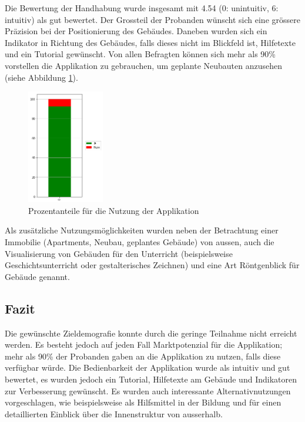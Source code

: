 \documentclass[a4paper]{scrreprt}
\begin{document}
Die Bewertung der Handhabung wurde insgesamt mit 4.54 (0: unintuitiv, 6: intuitiv) als gut bewertet. Der Grossteil der Probanden wünscht sich eine grössere Präzision bei der Positionierung des Gebäudes. Daneben wurden sich ein Indikator in Richtung des Gebäudes, falls dieses nicht im Blickfeld ist, Hilfetexte und ein Tutorial gewünscht. Von allen Befragten können sich mehr als 90\% vorstellen die Applikation zu gebrauchen, um geplante Neubauten anzusehen (siehe Abbildung \ref{fig:Nutzung}).

\begin{figure}[htb]
	\centering
	\includegraphics[keepaspectratio, width=0.3\textwidth]{Nutzung.png}
	\caption{Prozentanteile für die Nutzung der Applikation}
	\label{fig:Nutzung}
\end{figure}

Als zusätzliche Nutzungsmöglichkeiten wurden neben der Betrachtung einer Immobilie (Apartments, Neubau, geplantes Gebäude) von aussen, auch die Visualisierung von Gebäuden für den Unterricht (beispielsweise Geschichtsunterricht oder gestalterisches Zeichnen) und eine Art Röntgenblick für Gebäude genannt.

\subsection{Fazit}
Die gewünschte Zieldemografie konnte durch die geringe Teilnahme nicht erreicht werden. Es besteht jedoch auf jeden Fall Marktpotenzial für die Applikation; mehr als 90\% der Probanden gaben an die Applikation zu nutzen, falls diese verfügbar würde. Die Bedienbarkeit der Applikation wurde als intuitiv und gut bewertet, es wurden jedoch ein Tutorial, Hilfetexte am Gebäude und Indikatoren zur Verbesserung gewünscht. Es wurden auch interessante Alternativnutzungen vorgeschlagen, wie beispielsweise als Hilfsmittel in der Bildung und für einen detaillierten Einblick über die Innenstruktur von ausserhalb.
\end{document}
